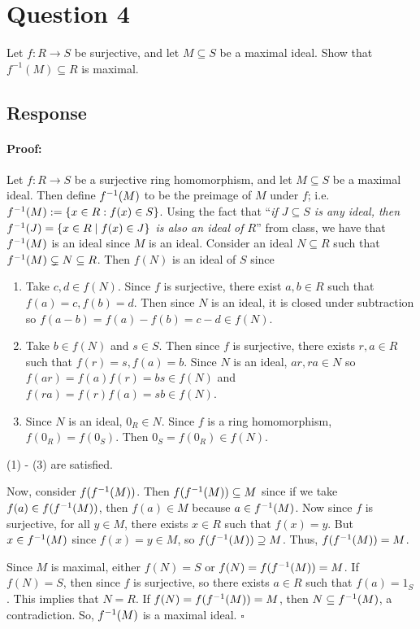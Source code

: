 \documentclass [12pt] {article}
\newenvironment{proof}{\paragraph{Proof:}}{\hfill$\square$}
\begin{document}
\newpage
\section*{Question 4}
Let $f:R\to S$ be surjective, and let $M\subseteq S$ be a maximal ideal. Show that $f^{-1}(M)\subseteq R$ is maximal. 
\subsection*{Response}
\begin{proof}
Let $f : R \to S$ be a surjective ring homomorphism, and let $M \subseteq S$ be a maximal ideal.
Then define $f^{-1}(M)$ to be the preimage of $M$ under $f$; i.e. $f^{-1}(M) := \{x \in R : f(x) \in S\}$.
Using the fact that ``\textit{if $J \subseteq S$ is any ideal, then $f^{-1}(J) = \{x \in R \mid f(x) \in J\}$
is also an ideal of $R$}'' from class, we have that $f^{-1}(M)$ is an ideal since $M$ is an ideal. 
Consider an ideal $N \subseteq R$ such that $f^{-1}(M) \subsetneq N \subseteq R$. Then $f(N)$ is an 
ideal of $S$ since
\begin{enumerate}
    \item Take $c, d \in f(N)$. Since $f$ is surjective, there exist $a, b \in R$ such that
        $f(a) = c, f(b) = d$. Then since $N$ is an ideal, it is closed under subtraction so
        $f(a - b) = f(a) - f(b) = c - d \in f(N)$.
    \item Take $b \in f(N)$ and $s \in S$. Then since $f$ is surjective, there exists
        $r, a \in R$ such that $f(r) = s, f(a) = b$. Since $N$ is an ideal, $ar, ra \in N$ so 
        $f(ar) = f(a)f(r) = bs \in f(N)$ and $f(ra) = f(r)f(a) = sb \in f(N)$.
    \item Since $N$ is an ideal, $0_R \in N$. Since $f$ is a ring homomorphism, $f(0_R) = f(0_S)$. Then
        $0_S = f(0_R) \in f(N)$.
\end{enumerate}
(1) - (3) are satisfied. 
\vspace{1em}

Now, consider $f(f^{-1}(M))$. Then $f(f^{-1}(M)) \subseteq M$ since if we take
$f(a) \in f(f^{-1}(M))$, then $f(a) \in M$ because $a \in f^{-1}(M)$. Now since $f$ is surjective,
for all $y \in M$, there exists $x \in R$ such that $f(x) = y$. But $x \in f^{-1}(M)$ since 
$f(x) = y \in M$, so $f(f^{-1}(M)) \supseteq M$. Thus, $f(f^{-1}(M)) = M$.
\vspace{1em}

Since $M$ is maximal, either $f(N) = S$ or $f(N) = f(f^{-1}(M)) = M$. If $f(N) = S$, then
since $f$ is surjective, so there exists $a \in R$ such that $f(a) = 1_S$. This implies that $N = R$. 
If $f(N) = f(f^{-1}(M)) = M$, then $N \subseteq f^{-1}(M)$, a contradiction. So, $f^{-1}(M)$ is a maximal ideal.
\end{proof}
\end{document}
